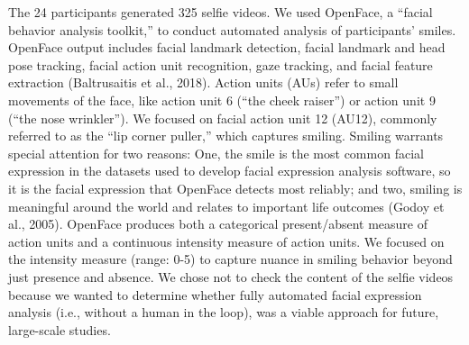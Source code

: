 \documentclass[authordate, empirical,issue]{jote-new-article}
\begin{document}
The 24 participants generated 325 selfie videos. We used OpenFace, a “facial behavior analysis toolkit,” to conduct automated analysis of participants' smiles. OpenFace output includes facial landmark detection, facial landmark and head pose tracking, facial action unit recognition, gaze tracking, and facial feature extraction (Baltrusaitis et al., 2018). Action units (AUs) refer to small movements of the face, like action unit 6 (“the cheek raiser”) or action unit 9 (“the nose wrinkler”). We focused on facial action unit 12 (AU12), commonly referred to as the “lip corner puller,” which captures smiling. Smiling warrants special attention for two reasons: One, the smile is the most common facial expression in the datasets used to develop facial expression analysis software, so it is the facial expression that OpenFace detects most reliably; and two, smiling is meaningful around the world and relates to important life outcomes (Godoy et al., 2005). OpenFace produces both a categorical present/absent measure of action units and a continuous intensity measure of action units. We focused on the intensity measure (range: 0-5) to capture nuance in smiling behavior beyond just presence and absence. We chose not to check the content of the selfie videos because we wanted to determine whether fully automated facial expression analysis (i.e., without a human in the loop), was a viable approach for future, large-scale studies.
\end{document}
